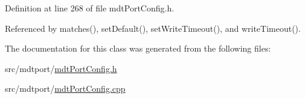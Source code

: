 Definition at line 268 of file mdt\-Port\-Config.\-h.



Referenced by matches(), set\-Default(), set\-Write\-Timeout(), and write\-Timeout().



The documentation for this class was generated from the following files\-:\begin{DoxyCompactItemize}
\item 
src/mdtport/\hyperlink{mdt_port_config_8h}{mdt\-Port\-Config.\-h}\item 
src/mdtport/\hyperlink{mdt_port_config_8cpp}{mdt\-Port\-Config.\-cpp}\end{DoxyCompactItemize}
